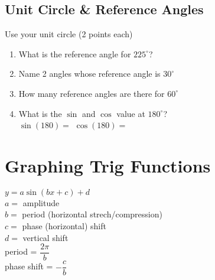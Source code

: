 \documentclass[12pt]{article}
\begin{document}
\subsection*{Unit Circle \& Reference Angles}

Use your unit circle (2 points each)\\

\begin{enumerate}[resume]

\item What is the reference angle for $225^\circ$?\\

\item Name 2 angles whose reference angle is $30^\circ$\\

\item How many reference angles are there for $60^\circ$\\

\item What is the $\sin$ and $\cos$ value at $180^\circ$?\\

$\sin(180)=$ \hspace{1in} $\cos(180)=$

\end{enumerate}

\section*{Graphing Trig Functions}





$y = a \sin(b x + c) + d$\\

$a=$ amplitude\\
$b=$ period (horizontal strech/compression)\\
$c=$ phase (horizontal) shift\\
$d=$ vertical shift\\


period = $\dfrac{2\pi}{b}$\\

phase shift = $-\dfrac{c}{b}$
\end{document}

